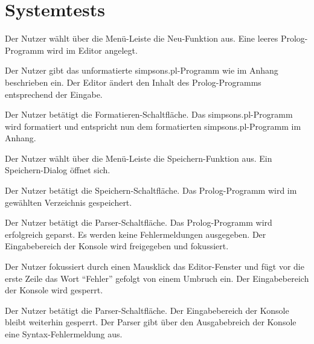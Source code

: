 \documentclass[parskip=full,11pt,twoside]{scrartcl}
\begin{document}

\newpage
\section{Systemtests}


{Der Nutzer wählt über die Menü-Leiste die Neu-Funktion aus.}
{Eine leeres Prolog-Programm wird im Editor angelegt.}

{Der Nutzer gibt das unformatierte simpsons.pl-Programm wie im Anhang beschrieben ein.}
{Der Editor ändert den Inhalt des Prolog-Programms entsprechend der Eingabe.}

{Der Nutzer betätigt die Formatieren-Schaltfläche.}
{Das simpsons.pl-Programm wird formatiert und entspricht nun dem formatierten simpsons.pl-Programm im Anhang.}

{Der Nutzer wählt über die Menü-Leiste die Speichern-Funktion aus.}
{Ein Speichern-Dialog öffnet sich.}

{Der Nutzer betätigt die Speichern-Schaltfläche.}
{Das Prolog-Programm wird im gewählten Verzeichnis gespeichert.}

{Der Nutzer betätigt die Parser-Schaltfläche.}
{Das Prolog-Programm wird erfolgreich geparst. Es werden keine Fehlermeldungen ausgegeben. Der Eingabebereich der Konsole wird freigegeben und fokussiert.}

{Der Nutzer fokussiert durch einen Mausklick das Editor-Fenster und fügt vor die erste Zeile das Wort \enquote{Fehler} gefolgt von einem Umbruch ein.}
{Der Eingabebereich der Konsole wird gesperrt.}

{Der Nutzer betätigt die Parser-Schaltfläche.}
{Der Eingabebereich der Konsole bleibt weiterhin gesperrt. Der Parser gibt über den Ausgabebreich der Konsole eine Syntax-Fehlermeldung aus.}
\end{document}
